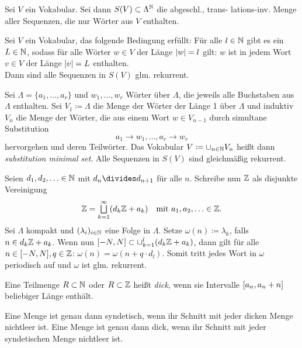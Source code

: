 \documentclass{cheat-sheet}
\begin{document}
\begin{defn}
  Sei $V$ ein Vokabular. Sei dann $S(V) \subset \Lambda^{\mathbb{N}}$ die abgeschl., trans- lations-inv. Menge aller Sequenzen, die nur Wörter aus $V$ enthalten.
\end{defn}

\begin{lem}
  Sei $V$ ein Vokabular, das folgende Bedingung erfüllt: Für alle $l \in \mathbb{N}$ gibt es ein $L \in \mathbb{N}$, sodass für alle Wörter $w \in V$ der Länge $\lvert w\rvert = l$ gilt: $w$ ist in jedem Wort $v \in V$ der Länge $\lvert v\rvert = L$ enthalten. \\
  Dann sind alle Sequenzen in $S(V)$ glm. rekurrent.
\end{lem}

\begin{bem}
  Sei $\Lambda = \{ a_1, \ldots, a_r \}$ und $w_1, \ldots, w_r$ Wörter über $\Lambda$, die jeweils alle Buchstaben aus $\Lambda$ enthalten. Sei $V_1 \coloneqq \Lambda$ die Menge der Wörter der Länge 1 über $\Lambda$ und induktiv $V_n$ die Menge der Wörter, die aus einem Wort $w \in V_{n-1}$ durch simultane Substitution
  \[ a_1 \to w_1, \ldots, a_r \to w_r \]
  hervorgehen und deren Teilwörter. Das Vokabular $V \coloneqq \cup_{n \in \mathbb{N}} V_n$ heißt dann \emph{substitution minimal set}. Alle Sequenzen in $S(V)$ sind gleichmäßig rekurrent.
\end{bem}

\begin{bem}
  Seien $d_1, d_2, \ldots \in \mathbb{N}$ mit $d_n \divides d_{n+1}$ für alle $n$.
  Schreibe nun $\mathbb{Z}$ als disjunkte Vereinigung
  \[
    \Z = \bigsqcup_{k=1}^\infty (d_k \Z + a_k) \quad
    \text{mit $a_1, a_2, \ldots \in \Z$.}
  \]
  Sei $\Lambda$ kompakt und $(\lambda_i)_{i \in \mathbb{N}}$ eine Folge in $\Lambda$. Setze
  $\omega(n) \coloneqq \lambda_k$, falls $n \in d_k \mathbb{Z} + a_k$.
  Wenn nun $[-N, N] \subset \sqcup_{k=1}^l (d_k \mathbb{Z} + a_k)$, dann gilt für alle $n \in [-N, N], q \in \mathbb{Z}$: $\omega(n) = \omega(n + q \cdot d_l)$. Somit tritt jedes Wort in $\omega$ periodisch auf und $\omega$ ist glm. rekurrent.
\end{bem}


\begin{defn}
  Eine Teilmenge $R \subset \mathbb{N}$ oder $R \subset \mathbb{Z}$ heißt \emph{dick}, wenn sie Intervalle $\left[ a_n, a_n + n \right]$ beliebiger Länge enthält.
\end{defn}

\begin{bem}
  Eine Menge ist genau dann syndetisch, wenn ihr Schnitt mit jeder dicken Menge nichtleer ist.
  Eine Menge ist genau dann dick, wenn ihr Schnitt mit jeder syndetischen Menge nichtleer ist.
\end{bem}
\end{document}
